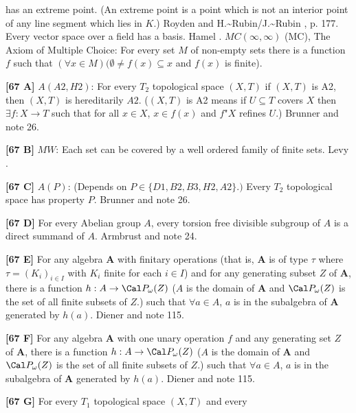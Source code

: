has an extreme point. (An extreme point is a point which is not an
interior point of any line segment which lies in  $K$.)
\ac{Royden} \cite{1963} and \ac{H.~Rubin/J.~Rubin} \cite{1985}, p. 177.
\medskip
{} Every vector space over a field has a basis. \ac{Hamel}
\cite{1905}.
\medskip
{} $MC(\infty,\infty)$ (MC), The Axiom of Multiple
Choice: For every set $M$ of non-empty sets there is a function $f$ such
that $(\forall x\in M)(\emptyset\neq f(x)\subseteq x$ and $f(x)$ is finite).
\smallskip
\item{}{\bf [67 A]} $A(A2,H2)$:  For every $T_2$ topological space $(X,T)$
if $(X,T)$ is A2, then $(X,T)$ is hereditarily $A2$. ($(X,T)$ is A2 means
if $U\subseteq T$ covers $X$ then $\exists f:X\rightarrow T$ such that
for all $x\in X$, $x\in f(x)$ and $f$"$X$ refines $U$.)
\ac{Brunner} \cite{1983d} and note 26.
\smallskip
\item{}{\bf [67 B]} $MW$:  Each set can be covered by a well ordered
family of finite sets.  \ac{Levy} \cite{1962}.
\smallskip
\item{}{\bf [67 C]} $A(P)$: (Depends on $P\in\{D1,B2,B3,H2,A2\}.)$
Every $T_2$ topological space has property $P$.  \ac{Brunner} \cite{1983d}
and note 26.
\smallskip
\item{}{\bf [67 D]}  For every Abelian group $A$, every torsion free
divisible subgroup of $A$ is a direct summand of $A$.  \ac{Armbrust}
\cite{1972} and note 24.
\smallskip
\item{}{\bf [67 E]} For any algebra {\bf A} with finitary operations
(that is, {\bf A} is of type $\tau$ where $\tau = (K_i)_{i\in I}$ with
$K_i$ finite for each $i\in I$) and for any generating subset $Z$ of
{\bf A}, there is a function $h: A\to \Cal P_\omega(Z)$ ($A$ is the
domain of {\bf A} and $\Cal P_\omega(Z)$ is the set of all finite
subsets of $Z$.) such that $\forall a\in A$, $a$ is in the
subalgebra of {\bf A} generated by $h(a)$.  \ac{Diener} \cite{1989} and
note 115.
\smallskip
\item{}{\bf [67 F]}  For any algebra {\bf A} with one unary operation $f$
and any generating set $Z$ of {\bf A}, there is
a function $h: A\to \Cal P_\omega(Z)$ ($A$ is the domain of {\bf A} and
$\Cal P_\omega(Z)$ is the set of all finite subsets of $Z$.) such that
$\forall a\in A$, $a$ is in the subalgebra of {\bf A} generated by
$h(a)$.  \ac{Diener} \cite{1989} and note 115.
\smallskip
\item{}{\bf [67 G]} For every $T_1$ topological space $(X,T)$ and every
